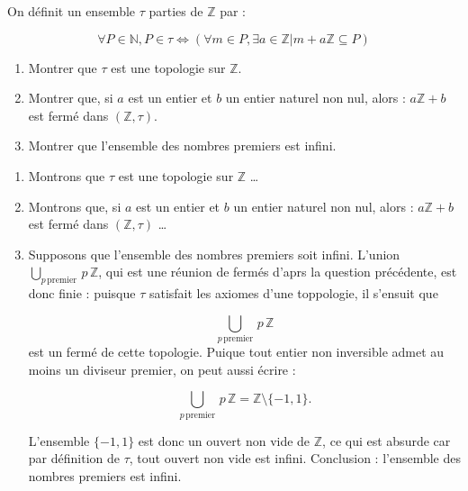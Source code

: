 \begin{exer}
On d\'efinit un ensemble $\tau$ parties de $\mathbb{Z}$ par :

\begin{equation}
\forall P \in \mathbb{N} , P \in \tau \Leftrightarrow ( \forall m \in P , \exists a \in \mathbb{Z} | m + a \mathbb{Z} \subseteq P)
\label{eq:def_topo_Zab}
\end{equation}

\begin{enumerate}
\item Montrer que $\tau$ est une topologie sur $\mathbb{Z}$.
\item Montrer que, si $a$ est un entier et $b$ un entier naturel non nul, alors : %
$a \mathbb{Z} + b$ est ferm\'e dans $(\mathbb{Z} , \tau)$.
\item Montrer que l'ensemble des nombres premiers est infini.
\end{enumerate}
\end{exer}

\begin{sol}
\begin{enumerate}
\item Montrons que $\tau$ est une topologie sur $\mathbb{Z}$ \dots
\item Montrons que, si $a$ est un entier et $b$ un entier naturel non nul, alors : %
$a \mathbb{Z} + b$ est ferm\'e dans $(\mathbb{Z} , \tau)$ \dots
\item Supposons que l'ensemble des nombres premiers soit infini. %
L'union \(\bigcup\limits_{p\,\text{premier}}\,p\,\mathbb{Z}\), %
qui est une r\'eunion de ferm\'es d'aprs la question pr\'ec\'edente, %
est donc finie : %
puisque \(\tau\) satisfait les axiomes d'une toppologie, il s'ensuit que

\begin{equation}
\bigcup\limits_{p\,\text{premier}}\,p\,\mathbb{Z}
\label{}
\end{equation}
est un ferm\'e de cette topologie. %
Puique tout entier non inversible admet au moins un diviseur premier, %
on peut aussi \'ecrire :

\begin{equation}
\bigcup\limits_{p\,\text{premier}}\,p\,\mathbb{Z} = \mathbb{Z} \setminus \{-1, 1\}.
\label{}
\end{equation}

\par
L'ensemble \(\{-1, 1\}\) est donc un ouvert non vide de \(\mathbb{Z}\), %
ce qui est absurde car par d\'efinition de \(\tau\), tout ouvert non vide est infini. %
% 
Conclusion : l'ensemble des nombres premiers est infini.
\end{enumerate}
\end{sol}

